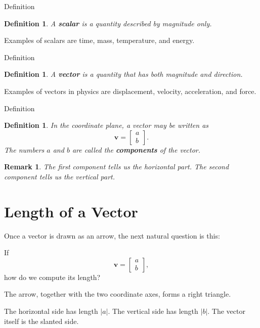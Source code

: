 \documentclass[11pt,a4paper]{article}
\newtheorem{definition}[theorem]{Definition}
\newtheorem{remark}[theorem]{Remark}
\newcommand{\vect}[1]{\boldsymbol{#1}}
\begin{document}
\begin{mathblock}{Definition}
\begin{definition}
A \textbf{scalar} is a quantity described by magnitude only.
\end{definition}
\end{mathblock}

Examples of scalars are time, mass, temperature, and energy.

\begin{mathblock}{Definition}
\begin{definition}
A \textbf{vector} is a quantity that has both magnitude and direction.
\end{definition}
\end{mathblock}

Examples of vectors in physics are displacement, velocity, acceleration, and force.

\begin{mathblock}{Definition}
\begin{definition}
In the coordinate plane, a vector may be written as
\[
\vect{v} =
\begin{bmatrix}
a \\ b
\end{bmatrix}.
\]
The numbers \(a\) and \(b\) are called the \textbf{components} of the vector.
\end{definition}
\end{mathblock}

\begin{remark}
The first component tells us the horizontal part. The second component tells us the vertical part.
\end{remark}

\section{Length of a Vector}

Once a vector is drawn as an arrow, the next natural question is this:

\begin{problemblock}
If
\[
\vect{v} =
\begin{bmatrix}
a \\ b
\end{bmatrix},
\]
how do we compute its length?
\end{problemblock}

\begin{intuitionblock}
The arrow, together with the two coordinate axes, forms a right triangle.

The horizontal side has length \(|a|\). The vertical side has length \(|b|\).
The vector itself is the slanted side.
\end{intuitionblock}
\end{document}
